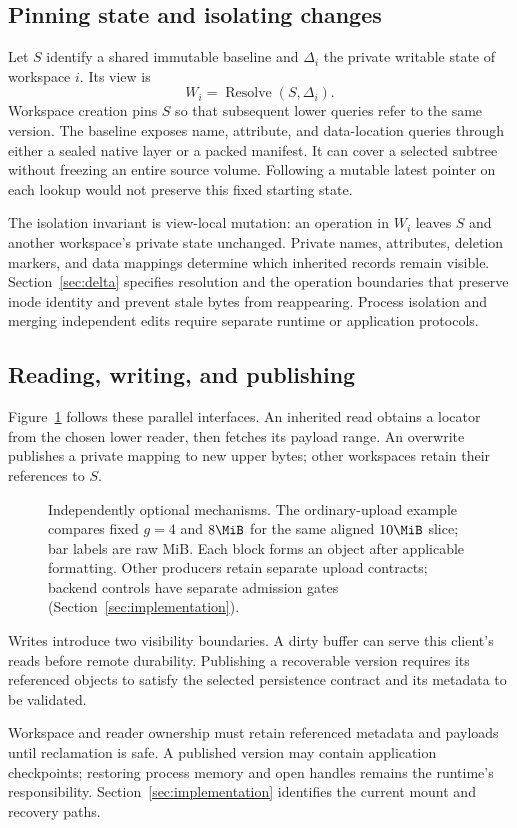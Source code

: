\subsection{Pinning state and isolating changes}

Let $S$ identify a shared immutable baseline and $\Delta_i$ the private
writable state of workspace $i$. Its view is
\begin{equation}
  W_i = \operatorname{Resolve}(S,\Delta_i).
\end{equation}
Workspace creation pins $S$ so that subsequent lower queries refer to the
same version. The baseline exposes name, attribute, and data-location
queries through either a sealed native layer or a packed manifest.
It can cover a selected subtree without freezing an entire source volume.
Following a mutable latest pointer on each lookup would not preserve
this fixed starting state.

The isolation invariant is view-local mutation: an operation in $W_i$
leaves $S$ and another workspace's private state unchanged. Private names,
attributes, deletion markers, and data mappings determine which inherited
records remain visible. Section~\ref{sec:delta} specifies resolution and
the operation boundaries that preserve inode identity and prevent stale
bytes from reappearing. Process isolation and merging independent edits
require separate runtime or application protocols.

\subsection{Reading, writing, and publishing}

Figure~\ref{fig:overview} follows these parallel interfaces. An inherited
read obtains a locator from the chosen lower reader, then fetches its
payload range. An overwrite publishes a private mapping to new upper
bytes; other workspaces retain their references to $S$.

\begin{figure}[!t]
\centering

\caption{Independently optional mechanisms. The ordinary-upload example
compares fixed $g=4$ and $8\MiB$ for the same aligned $10\MiB$ slice; bar labels are
raw MiB. Each block forms an object after applicable formatting.
Other producers retain separate upload contracts; backend controls have
separate admission gates (Section~\ref{sec:implementation}).}
\label{fig:overview}
\end{figure}

Writes introduce two visibility boundaries. A dirty buffer can serve
this client's reads before remote durability. Publishing a recoverable
version requires its referenced objects to satisfy the selected
persistence contract and its metadata to be validated.

Workspace and reader ownership must retain referenced metadata and
payloads until reclamation is safe. A published version may contain
application checkpoints; restoring process memory and open handles
remains the runtime's responsibility. Section~\ref{sec:implementation}
identifies the current mount and recovery paths.
